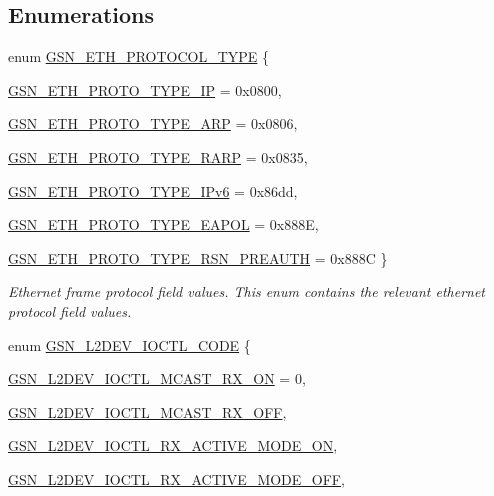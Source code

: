 \subsection*{Enumerations}
\begin{DoxyCompactItemize}
\item 
enum \hyperlink{a00670_ga5be81e41aa75406c2f3b778aa073e052}{GSN\_\-ETH\_\-PROTOCOL\_\-TYPE} \{ \par
\hyperlink{a00670_gga5be81e41aa75406c2f3b778aa073e052a97192703872038779e4de9e92df50b06}{GSN\_\-ETH\_\-PROTO\_\-TYPE\_\-IP} =  0x0800, 
\par
\hyperlink{a00670_gga5be81e41aa75406c2f3b778aa073e052aafef0478501576893ebb9786b441130e}{GSN\_\-ETH\_\-PROTO\_\-TYPE\_\-ARP} =  0x0806, 
\par
\hyperlink{a00670_gga5be81e41aa75406c2f3b778aa073e052a26245450afddbdbad797e8eb9a3344b1}{GSN\_\-ETH\_\-PROTO\_\-TYPE\_\-RARP} =  0x0835, 
\par
\hyperlink{a00670_gga5be81e41aa75406c2f3b778aa073e052a5e2c8dbf59e0d7a50f91e1132cbdd462}{GSN\_\-ETH\_\-PROTO\_\-TYPE\_\-IPv6} =  0x86dd, 
\par
\hyperlink{a00670_gga5be81e41aa75406c2f3b778aa073e052a9a560452870b9062c401688e7c6a133d}{GSN\_\-ETH\_\-PROTO\_\-TYPE\_\-EAPOL} =  0x888E, 
\par
\hyperlink{a00670_gga5be81e41aa75406c2f3b778aa073e052aa6085d61a973526b9a05262cd6c301b2}{GSN\_\-ETH\_\-PROTO\_\-TYPE\_\-RSN\_\-PREAUTH} =  0x888C
 \}
\begin{DoxyCompactList}\small\item\em Ethernet frame protocol field values. This enum contains the relevant ethernet protocol field values. \end{DoxyCompactList}\item 
enum \hyperlink{a00670_ga8d699f24bea4c9cf889e2cd1e854d06e}{GSN\_\-L2DEV\_\-IOCTL\_\-CODE} \{ \par
\hyperlink{a00670_gga8d699f24bea4c9cf889e2cd1e854d06ea409e1730531dd9d13865f463c790e9af}{GSN\_\-L2DEV\_\-IOCTL\_\-MCAST\_\-RX\_\-ON} =  0, 
\par
\hyperlink{a00670_gga8d699f24bea4c9cf889e2cd1e854d06ea4a8743a76cfc411624f4628f99e6a16a}{GSN\_\-L2DEV\_\-IOCTL\_\-MCAST\_\-RX\_\-OFF}, 
\par
\hyperlink{a00670_gga8d699f24bea4c9cf889e2cd1e854d06ead2aa23f87d755f6451f1a57b1277d041}{GSN\_\-L2DEV\_\-IOCTL\_\-RX\_\-ACTIVE\_\-MODE\_\-ON}, 
\par
\hyperlink{a00670_gga8d699f24bea4c9cf889e2cd1e854d06ea84400faa87927ff618b22b1fd9f3a3dc}{GSN\_\-L2DEV\_\-IOCTL\_\-RX\_\-ACTIVE\_\-MODE\_\-OFF}, 

\end{DoxyCompactItemize}
